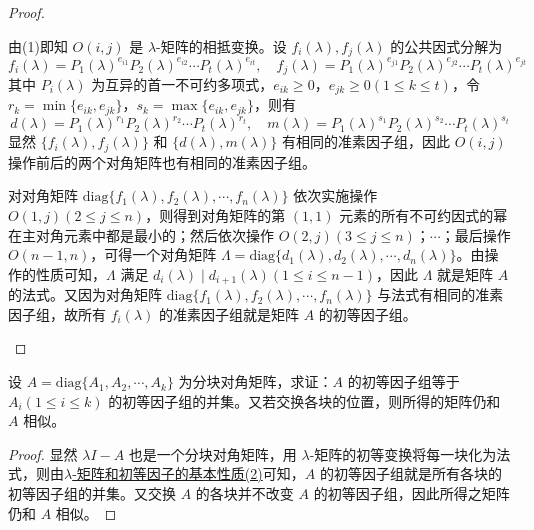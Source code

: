 \documentclass[../../main.tex]{subfiles}%
\begin{document}
\begin{proof}
\begin{enumerate}[(1)]
由(1)即知 \(O(i,j)\) 是 \(\lambda\)-矩阵的相抵变换。设 \(f_i(\lambda),f_j(\lambda)\) 的公共因式分解为
\[
f_i(\lambda)=P_1(\lambda)^{e_{i1}}P_2(\lambda)^{e_{i2}}\cdots P_t(\lambda)^{e_{it}}, \quad f_j(\lambda)=P_1(\lambda)^{e_{j1}}P_2(\lambda)^{e_{j2}}\cdots P_t(\lambda)^{e_{jt}}
\]
其中 \(P_i(\lambda)\) 为互异的首一不可约多项式，\(e_{ik}\geqslant 0\)，\(e_{jk}\geqslant 0(1\leqslant  k\leqslant  t)\)，令 \(r_k = \min\{e_{ik},e_{jk}\}\)，\(s_k = \max\{e_{ik},e_{jk}\}\)，则有
\[
d(\lambda)=P_1(\lambda)^{r_1}P_2(\lambda)^{r_2}\cdots P_t(\lambda)^{r_t}, \quad m(\lambda)=P_1(\lambda)^{s_1}P_2(\lambda)^{s_2}\cdots P_t(\lambda)^{s_t}
\]
显然 \(\{f_i(\lambda),f_j(\lambda)\}\) 和 \(\{d(\lambda),m(\lambda)\}\) 有相同的准素因子组，因此 \(O(i,j)\) 操作前后的两个对角矩阵也有相同的准素因子组。

对对角矩阵 \(\mathrm{diag}\{f_1(\lambda),f_2(\lambda),\cdots,f_n(\lambda)\}\) 依次实施操作 \(O(1,j)(2\leqslant  j\leqslant  n)\)，则得到对角矩阵的第 \((1,1)\) 元素的所有不可约因式的幂在主对角元素中都是最小的；然后依次操作 \(O(2,j)(3\leqslant  j\leqslant  n)\)；\(\cdots\)；最后操作 \(O(n - 1,n)\)，可得一个对角矩阵 \(\varLambda=\mathrm{diag}\{d_1(\lambda),d_2(\lambda),\cdots,d_n(\lambda)\}\)。由操作的性质可知，\(\varLambda\) 满足 \(d_i(\lambda)\mid d_{i + 1}(\lambda)(1\leqslant  i\leqslant  n - 1)\)，因此 \(\varLambda\) 就是矩阵 \(A\) 的法式。又因为对角矩阵 \(\mathrm{diag}\{f_1(\lambda),f_2(\lambda),\cdots,f_n(\lambda)\}\) 与法式有相同的准素因子组，故所有 \(f_i(\lambda)\) 的准素因子组就是矩阵 \(A\) 的初等因子组。
\end{enumerate}
\end{proof}

\begin{proposition}
设 \(A = \mathrm{diag}\{A_1,A_2,\cdots,A_k\}\) 为分块对角矩阵，求证：\(A\) 的初等因子组等于 \(A_i(1\leqslant  i\leqslant  k)\) 的初等因子组的并集。又若交换各块的位置，则所得的矩阵仍和 \(A\) 相似。
\end{proposition}
\begin{proof}
显然 \(\lambda I - A\) 也是一个分块对角矩阵，用 \(\lambda\)-矩阵的初等变换将每一块化为法式，则由\hyperref[theorem:lambda-矩阵和初等因子的基本性质]{$\lambda$-矩阵和初等因子的基本性质(2)}可知，\(A\) 的初等因子组就是所有各块的初等因子组的并集。又交换 \(A\) 的各块并不改变 \(A\) 的初等因子组，因此所得之矩阵仍和 \(A\) 相似。
\end{proof}
\end{document}
